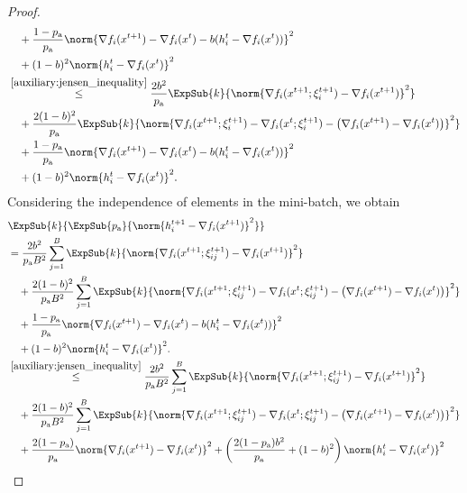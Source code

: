 \documentclass{article}
\newcommand*{\probavailable}{\ensuremath{p_{\textnormal{a}}}}
\begin{document}
\begin{proof}
\begin{align*}
    &\quad + \frac{1 - \probavailable}{\probavailable} \norm{\nabla f_i(x^{t+1}) - \nabla f_i(x^{t}) - b(h^t_i - \nabla f_i(x^{t}))}^2 \\
    &\quad + (1 - b)^2\norm{h^t_i - \nabla f_i(x^{t})}^2 \\
    &\overset{\eqref{auxiliary:jensen_inequality}}{\leq} \frac{2 b^2}{\probavailable} \ExpSub{k}{\norm{\nabla f_i(x^{t+1};\xi^{t+1}_{i}) - \nabla f_i(x^{t+1})}^2} \\
    &\quad + \frac{2 (1 - b)^2}{\probavailable} \ExpSub{k}{\norm{\nabla f_i(x^{t+1};\xi^{t+1}_{i}) - \nabla f_i(x^{t};\xi^{t+1}_{i}) - \left(\nabla f_i(x^{t+1}) - \nabla f_i(x^{t})\right)}^2} \\
    &\quad + \frac{1 - \probavailable}{\probavailable} \norm{\nabla f_i(x^{t+1}) - \nabla f_i(x^{t}) - b(h^t_i - \nabla f_i(x^{t}))}^2 \\
    &\quad + (1 - b)^2\norm{h^t_i - \nabla f_i(x^{t})}^2.
  \end{align*}
  Considering the independence of elements in the mini-batch, we obtain
  \begin{align*}
    &\ExpSub{k}{\ExpSub{\probavailable}{\norm{h^{t+1}_i - \nabla f_i(x^{t+1})}^2}} \\
    &= \frac{2 b^2}{\probavailable B^2} \sum_{j=1}^B \ExpSub{k}{\norm{\nabla f_i(x^{t+1};\xi^{t+1}_{ij}) - \nabla f_i(x^{t+1})}^2} \\
    &\quad + \frac{2 (1 - b)^2}{\probavailable B^2} \sum_{j=1}^B \ExpSub{k}{\norm{\nabla f_i(x^{t+1};\xi^{t+1}_{ij}) - \nabla f_i(x^{t};\xi^{t+1}_{ij}) - \left(\nabla f_i(x^{t+1}) - \nabla f_i(x^{t})\right)}^2} \\
    &\quad + \frac{1 - \probavailable}{\probavailable} \norm{\nabla f_i(x^{t+1}) - \nabla f_i(x^{t}) - b(h^t_i - \nabla f_i(x^{t}))}^2 \\
    &\quad + (1 - b)^2\norm{h^t_i - \nabla f_i(x^{t})}^2. \\
    &\overset{\eqref{auxiliary:jensen_inequality}}{\leq} \frac{2 b^2}{\probavailable B^2} \sum_{j=1}^B \ExpSub{k}{\norm{\nabla f_i(x^{t+1};\xi^{t+1}_{ij}) - \nabla f_i(x^{t+1})}^2} \\
    &\quad + \frac{2 (1 - b)^2}{\probavailable B^2} \sum_{j=1}^B \ExpSub{k}{\norm{\nabla f_i(x^{t+1};\xi^{t+1}_{ij}) - \nabla f_i(x^{t};\xi^{t+1}_{ij}) - \left(\nabla f_i(x^{t+1}) - \nabla f_i(x^{t})\right)}^2} \\
    &\quad + \frac{2(1 - \probavailable)}{\probavailable} \norm{\nabla f_i(x^{t+1}) - \nabla f_i(x^{t})}^2 + \left(\frac{2 (1 - \probavailable) b^2}{\probavailable} + (1 - b)^2\right)\norm{h^t_i - \nabla f_i(x^{t})}^2 \\

\end{align*}
\end{proof}
\end{document}
